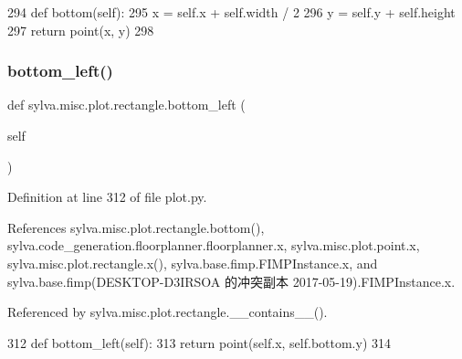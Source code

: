 \begin{DoxyCode}
294         \textcolor{keyword}{def }bottom(self):
295             x = self.x + self.width / 2
296             y = self.y + self.height
297             \textcolor{keywordflow}{return} point(x, y)
298 
\end{DoxyCode}
\mbox{\label{classsylva_1_1misc_1_1plot_1_1rectangle_a7c8c635a0a782c8e304f7440b74d8066}} 
\subsubsection{\texorpdfstring{bottom\+\_\+left()}{bottom\_left()}}
{\footnotesize\ttfamily def sylva.\+misc.\+plot.\+rectangle.\+bottom\+\_\+left (\begin{DoxyParamCaption}\item[{}]{self }\end{DoxyParamCaption})}



Definition at line 312 of file plot.\+py.



References sylva.\+misc.\+plot.\+rectangle.\+bottom(), sylva.\+code\+\_\+generation.\+floorplanner.\+floorplanner.\+x, sylva.\+misc.\+plot.\+point.\+x, sylva.\+misc.\+plot.\+rectangle.\+x(), sylva.\+base.\+fimp.\+F\+I\+M\+P\+Instance.\+x, and sylva.\+base.\+fimp(\+D\+E\+S\+K\+T\+O\+P-\/\+D3\+I\+R\+S\+O\+A 的冲突副本 2017-\/05-\/19).\+F\+I\+M\+P\+Instance.\+x.



Referenced by sylva.\+misc.\+plot.\+rectangle.\+\_\+\+\_\+contains\+\_\+\+\_\+().


\begin{DoxyCode}
312         \textcolor{keyword}{def }bottom\_left(self):
313             \textcolor{keywordflow}{return} point(self.x, self.bottom.y)
314 
\end{DoxyCode}
\mbox{\label{classsylva_1_1misc_1_1plot_1_1rectangle_a657018c2fcbc892047da2f18166aae85}} 
